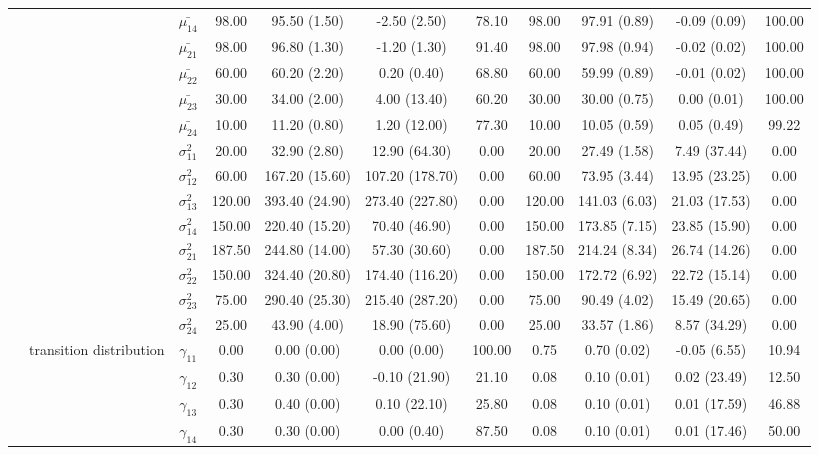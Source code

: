 \begin{table}[h]
{\begin{tabular}{ccccccccccc}
 &  & $\bar{\mu_{14}}$ & 98.00 & 95.50 (1.50) & -2.50 (2.50) & 78.10 & 98.00 & 97.91 (0.89) & -0.09 (0.09) & 100.00 \\
 &  & $\bar{\mu_{21}}$ & 98.00 & 96.80 (1.30) & -1.20 (1.30) & 91.40 & 98.00 & 97.98 (0.94) & -0.02 (0.02) & 100.00 \\
 &  & $\bar{\mu_{22}}$ & 60.00 & 60.20 (2.20) & 0.20 (0.40) & 68.80 & 60.00 & 59.99 (0.89) & -0.01 (0.02) & 100.00 \\
 &  & $\bar{\mu_{23}}$ & 30.00 & 34.00 (2.00) & 4.00 (13.40) & 60.20 & 30.00 & 30.00 (0.75) & 0.00 (0.01) & 100.00 \\
 &  & $\bar{\mu_{24}}$ & 10.00 & 11.20 (0.80) & 1.20 (12.00) & 77.30 & 10.00 & 10.05 (0.59) & 0.05 (0.49) & 99.22 \\
 &  & $\sigma^2_{11}$ & 20.00 & 32.90 (2.80) & 12.90 (64.30) & 0.00 & 20.00 & 27.49 (1.58) & 7.49 (37.44) & 0.00 \\
 &  & $\sigma^2_{12}$ & 60.00 & 167.20 (15.60) & 107.20 (178.70) & 0.00 & 60.00 & 73.95 (3.44) & 13.95 (23.25) & 0.00 \\
 &  & $\sigma^2_{13}$ & 120.00 & 393.40 (24.90) & 273.40 (227.80) & 0.00 & 120.00 & 141.03 (6.03) & 21.03 (17.53) & 0.00 \\
 &  & $\sigma^2_{14}$ & 150.00 & 220.40 (15.20) & 70.40 (46.90) & 0.00 & 150.00 & 173.85 (7.15) & 23.85 (15.90) & 0.00 \\
 &  & $\sigma^2_{21}$ & 187.50 & 244.80 (14.00) & 57.30 (30.60) & 0.00 & 187.50 & 214.24 (8.34) & 26.74 (14.26) & 0.00 \\
 &  & $\sigma^2_{22}$ & 150.00 & 324.40 (20.80) & 174.40 (116.20) & 0.00 & 150.00 & 172.72 (6.92) & 22.72 (15.14) & 0.00 \\
 &  & $\sigma^2_{23}$ & 75.00 & 290.40 (25.30) & 215.40 (287.20) & 0.00 & 75.00 & 90.49 (4.02) & 15.49 (20.65) & 0.00 \\
 &  & $\sigma^2_{24}$ & 25.00 & 43.90 (4.00) & 18.90 (75.60) & 0.00 & 25.00 & 33.57 (1.86) & 8.57 (34.29) & 0.00 \\
 & transition distribution & $\gamma_{11}$ & 0.00 & 0.00 (0.00) & 0.00 (0.00) & 100.00 & 0.75 & 0.70 (0.02) & -0.05 (6.55) & 10.94 \\
 & \multirow{15}{*}{} & $\gamma_{12}$ & 0.30 & 0.30 (0.00) & -0.10 (21.90) & 21.10 & 0.08 & 0.10 (0.01) & 0.02 (23.49) & 12.50 \\
 &  & $\gamma_{13}$ & 0.30 & 0.40 (0.00) & 0.10 (22.10) & 25.80 & 0.08 & 0.10 (0.01) & 0.01 (17.59) & 46.88 \\
 &  & $\gamma_{14}$ & 0.30 & 0.30 (0.00) & 0.00 (0.40) & 87.50 & 0.08 & 0.10 (0.01) & 0.01 (17.46) & 50.00 \\

\end{tabular}}
\end{table}
